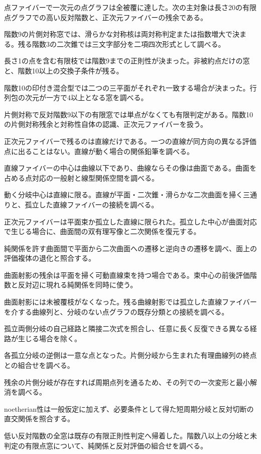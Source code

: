 \documentclass[11pt,a4paper]{ltjsarticle}
\begin{document}
点ファイバーで一次元の点グラフは全被覆に達した。次の主対象は長さ20の有限点グラフでの高い反対階数と、正次元ファイバーの残余である。


階数9の片側対称窓では、滑らかな対称核は両対称判定または指数増大で決まる。残る階数3の二次錐では三文字部分を二項四次形式として調べる。

長さ1の点を含む有限枝では階数9までの正則性が決まった。非被約点だけの窓と、階数10以上の交換子条件が残る。

階数10の印付き混合型では二つの三平面がそれぞれ一致する場合が決まった。行列包の次元が一方で4以上となる窓を調べる。

片側対称で反対階数9以下の有限窓では単点がなくても有限判定がある。階数10の片側対称残余と対称性自体の認識、正次元ファイバーを扱う。

正次元ファイバーで残るのは直線だけである。一つの直線が同方向の異なる評価点に出ることはない。直線が動く場合の関係鉛筆を調べる。

直線ファイバーの中心は曲線以下であり、曲線ならその像は曲面である。曲面を占める点対応の一般射と線型関係空間を調べる。

動く分岐中心は直線に限る。直線が平面・二次錐・滑らかな二次曲面を掃く三通りと、孤立した直線ファイバーの接続を調べる。

正次元ファイバーは平面束か孤立した直線に限られた。孤立した中心が曲面対応で生じる場合に、曲面間の双有理写像と二次関係を復元する。

純関係を許す曲面間で平面から二次曲面への遷移と逆向きの遷移を調べ、面上の評価複体の退化と照合する。

曲面射影の残余は平面を掃く可動直線束を持つ場合である。束中心の前後評価階数と反対辺に現れる純関係を同時に使う。

曲面射影には未被覆枝がなくなった。残る曲線射影では孤立した直線ファイバーを介する曲線列と、分岐のない点グラフの既存分類との接続を調べる。

孤立両側分岐の自己経路と隣接二次式を照合し、任意に長く反復できる異なる経路が生じる場合を除く。

各孤立分岐の逆側は一意な点となった。片側分岐から生まれた有理曲線列の終点との組合せを調べる。

残余の片側分岐が存在すれば周期点列を通るため、その列での一次変形と最小解消を調べる。

noetherian性は一般仮定に加えず、必要条件として得た短周期分岐と反対切断の直交関係を照合する。

低い反対階数の全窓は既存の有限正則性判定へ帰着した。階数八以上の分岐と未判定の有限点窓について、純関係と反対評価の組合せを調べる。
\end{document}
